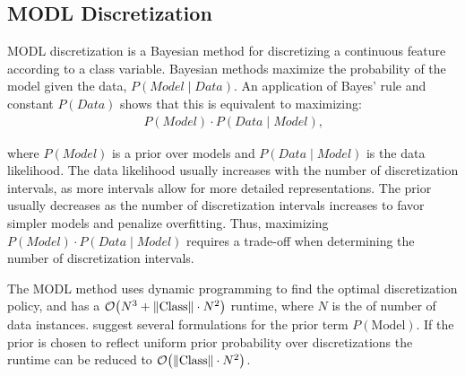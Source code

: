 
\subsection{MODL Discretization}
MODL discretization \citep{Boulle_2006} is a Bayesian method for discretizing a continuous feature according to a class variable. Bayesian methods maximize the probability of the model given the data, $P(\textit{Model} \mid \textit{Data})$. An application of Bayes' rule and constant $P(\textit{Data})$ shows that this is equivalent to maximizing:
\begin{align}
P(\textit{Model}) \cdot P(\textit{Data} \mid \textit{Model})\text{,}
\end{align}

\noindent
where $P(\textit{Model})$ is a prior over models and $P(\textit{Data} \mid \textit{Model})$ is the data likelihood.
The data likelihood usually increases with the number of discretization intervals, as more intervals allow for more detailed representations.
The prior usually decreases as the number of discretization intervals increases to favor simpler models and penalize overfitting.
Thus, maximizing $P(\textit{Model}) \cdot P(\textit{Data} \mid \textit{Model})$ requires a trade-off when determining the number of discretization intervals.

The MODL method uses dynamic programming to find the optimal discretization policy, and has a $\bigo\paren{N^3 + \|\text{Class}\| \cdot N^2}$ runtime, where $N$ is the of number of data instances. \cite{Lustgarten_2011} suggest several formulations for the prior term $P(\text{Model})$. If the prior is chosen to reflect uniform prior probability over discretizations the runtime can be reduced to $\bigo\paren{\|\text{Class}\| \cdot N^2}$.

